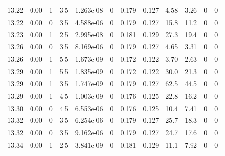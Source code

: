 \documentclass[preview]{standalone}
\begin{document}
{{{{{{{{{{{{\begin{tabular}{L{1.2cm}C{1.2cm} C{0.3cm}C{0.5cm} C{1.4cm}C{1.4cm} C{1.4cm}C{1.4cm} C{1.6cm}C{1.6cm} C{1.6cm}C{1.6cm}}
  13.22  &  0.00  & 1     & 3.5 &  1.263e-08  & 0  &  0.179&   0.127& 4.58 & 3.26   &  0 & 0  \\ 
  13.22  &  0.00  & 0     & 3.5 &  4.588e-06  & 0  &  0.179&   0.127& 15.8 & 11.2   &  0 & 0  \\ 
  13.23  &  0.00  & 1     & 2.5 &  2.995e-08  & 0  &  0.181&   0.129& 27.3 & 19.4   &  0 & 0  \\ 
  13.26  &  0.00  & 0     & 3.5 &  8.169e-06  & 0  &  0.179&   0.127& 4.65 & 3.31   &  0 & 0  \\ 
  13.26  &  0.00  & 1     & 5.5 &  1.673e-09  & 0  &  0.172&   0.122& 3.70 & 2.63   &  0 & 0  \\ 
  13.29  &  0.00  & 1     & 5.5 &  1.835e-09  & 0  &  0.172&   0.122& 30.0 & 21.3   &  0 & 0  \\ 
  13.29  &  0.00  & 1     & 3.5 &  1.747e-09  & 0  &  0.179&   0.127& 62.5 & 44.5   &  0 & 0  \\ 
  13.29  &  0.00  & 1     & 4.5 &  1.003e-09  & 0  &  0.176&   0.125& 22.8 & 16.2   &  0 & 0  \\ 
  13.30  &  0.00  & 0     & 4.5 &  6.553e-06  & 0  &  0.176&   0.125& 10.4 & 7.41   &  0 & 0  \\ 
  13.32  &  0.00  & 0     & 3.5 &  6.254e-06  & 0  &  0.179&   0.127& 25.7 & 18.3   &  0 & 0  \\ 
  13.32  &  0.00  & 0     & 3.5 &  9.162e-06  & 0  &  0.179&   0.127& 24.7 & 17.6   &  0 & 0  \\ 
  13.34  &  0.00  & 1     & 2.5 &  3.841e-09  & 0  &  0.181&   0.129& 11.1 & 7.92   &  0 & 0  \\ 
\hline 
\end{tabular} 

}}}}}}}}}}}}
\end{document}
